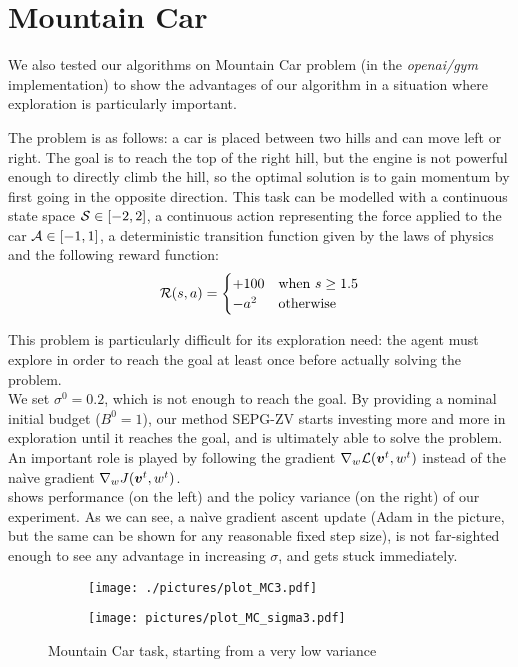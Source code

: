 \section{Mountain Car}\label{sec:mountain}

We also tested our algorithms on Mountain Car problem (in the \textit{openai/gym} implementation) to show the advantages of our algorithm in a situation where exploration is particularly important. 


The problem is as follows: a car is placed between two hills and can move left or right. The goal is to reach the top of the right hill, but the engine is not powerful enough to directly climb the hill, so the optimal solution is to gain momentum by first going in the opposite direction. This task can be modelled with a continuous state space $\mathcal{S} \in [-2, 2]$, a continuous action representing the force applied to the car $\mathcal{A} \in [-1, 1]$, a deterministic transition function given by the laws of physics and the following reward function:
\begin{equation*}
\mathcal{R}(s,a) = \begin{cases} +100 & \textrm{when } s \geq 1.5 \\ -a^2 & \textrm{otherwise} \end{cases}
\end{equation*}

This problem is particularly difficult for its exploration need: the agent must explore in order to reach the goal at least once before actually solving the problem. \\
We set $\sigma^0 = 0.2$, which is not enough to reach the goal. By providing a nominal initial budget ($B^0 = 1$), our method SEPG-ZV starts investing more and more in exploration until it reaches the goal, and is ultimately able to solve the problem. An important role is played by following the gradient $ \nabla_{w}\mathcal{L}(\boldsymbol{v}^t, w^t)$ instead of the na\`ive gradient $\nabla_w J(\boldsymbol{v}^t, w^t)$. \\
 shows performance (on the left) and the policy variance (on the right) of our experiment. As we can see, a na\`ive gradient ascent update (Adam in the picture, but the same can be shown for any reasonable fixed step size), is not far-sighted enough to see any advantage in increasing $\sigma$, and gets stuck immediately. 


\begin{figure}[t]
\centering
\begin{subfigure}[t]{0.49\textwidth}
\texttt{[image: ./pictures/plot\_MC3.pdf]}
\end{subfigure}
\begin{subfigure}[t]{0.49\textwidth}
\texttt{[image: pictures/plot\_MC\_sigma3.pdf]}
\end{subfigure}
\caption{Mountain Car task, starting from a very low variance}\label{fig:mc}
\end{figure}





